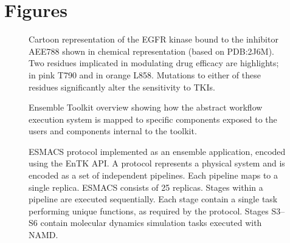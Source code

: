 \documentclass{bmcart}
\begin{document}





\section{Figures}

\begin{figure}[h!]
\caption{
  Cartoon representation of the EGFR kinase bound to the inhibitor
  AEE788 shown in chemical representation (based on PDB:2J6M). Two residues
  implicated in modulating drug efficacy are highlights; in pink T790 and in
  orange L858. Mutations to either of these residues significantly alter the
  sensitivity to TKIs.}
  \label{fig:egfr}
  \end{figure}

\begin{figure}[h!]
\caption{
  Ensemble Toolkit overview showing how the abstract
  workflow execution system is mapped to specific components exposed
  to the users and components internal to the toolkit.}
  \label{fig:entk_arch}
  \end{figure}


\begin{figure}[h!]
\caption{
  ESMACS protocol implemented as an ensemble application, encoded
  using the EnTK API\@. A protocol represents a physical system and is
  encoded as a set of independent pipelines. Each pipeline maps to a single
  replica. ESMACS consists of 25 replicas. Stages within a pipeline are
  executed sequentially. Each stage contain a single task performing unique
  functions, as required by the protocol. Stages S3--S6 contain molecular
  dynamics simulation tasks executed with NAMD\@.}
  \label{figure:HTBAC}
  \end{figure}
\end{document}
